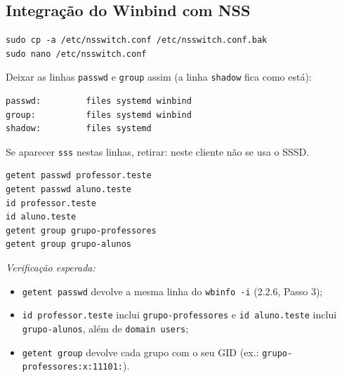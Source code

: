 
\subsection[Integração do Winbind com NSS]{Integração do Winbind com NSS}



\begin{lstlisting}[style=bashstyle]
sudo cp -a /etc/nsswitch.conf /etc/nsswitch.conf.bak
sudo nano /etc/nsswitch.conf
\end{lstlisting}

Deixar as linhas \texttt{passwd} e \texttt{group} assim (a linha \texttt{shadow} fica como está):

\begin{lstlisting}[style=cfgstyle]
passwd:         files systemd winbind
group:          files systemd winbind
shadow:         files systemd
\end{lstlisting}

Se aparecer \texttt{sss} nestas linhas, retirar: neste cliente não se usa o SSSD.


\begin{lstlisting}[style=bashstyle]
getent passwd professor.teste
getent passwd aluno.teste
id professor.teste
id aluno.teste
getent group grupo-professores
getent group grupo-alunos
\end{lstlisting}

\emph{Verificação esperada:}

\begin{itemize}
\item \texttt{getent passwd} devolve a mesma linha do \texttt{wbinfo -i} (2.2.6, Passo 3);
\item \texttt{id professor.teste} inclui \texttt{grupo-professores} e \texttt{id aluno.teste} inclui \texttt{grupo-alunos}, além de \texttt{domain users};
\item \texttt{getent group} devolve cada grupo com o seu GID (ex.: \texttt{grupo-professores:x:11101:}).
\end{itemize}

